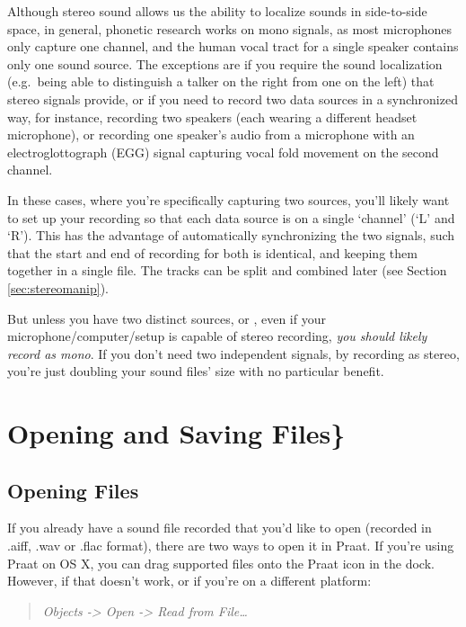 Although stereo sound allows us the ability to localize sounds in
side-to-side space, in general, phonetic research works on mono signals,
as most microphones only capture one channel, and the human vocal tract
for a single speaker contains only one sound source. The exceptions are
if you require the sound localization (e.g.~being able to distinguish a
talker on the right from one on the left) that stereo signals provide,
or if you need to record two data sources in a synchronized way, for
instance, recording two speakers (each wearing a different headset
microphone), or recording one speaker's audio from a microphone with an
electroglottograph (EGG) signal capturing vocal fold movement on the
second channel.

In these cases, where you're specifically capturing two sources, you'll
likely want to set up your recording so that each data source is on a
single `channel' (`L' and `R'). This has the advantage of automatically
synchronizing the two signals, such that the start and end of recording
for both is identical, and keeping them together in a single file. The
tracks can be split and combined later (see Section
\ref{sec:stereomanip}).

But unless you have two distinct sources, or , even if your
microphone/computer/setup is capable of stereo recording, \emph{you
should likely record as mono}. If you don't need two independent
signals, by recording as stereo, you're just doubling your sound files'
size with no particular benefit.

\hypertarget{opening-and-saving-files}{%
\section{Opening and Saving Files\}}\label{opening-and-saving-files}}

\label{opening}

\hypertarget{opening-files}{%
\subsection{Opening Files}\label{opening-files}}

If you already have a sound file recorded that you'd like to open
(recorded in .aiff, .wav or .flac format), there are two ways to open it
in Praat. If you're using Praat on OS X, you can drag supported files
onto the Praat icon in the dock. However, if that doesn't work, or if
you're on a different platform:

\begin{quote}
\emph{Objects -\textgreater{} Open -\textgreater{} Read from
File\ldots{}}
\end{quote}


